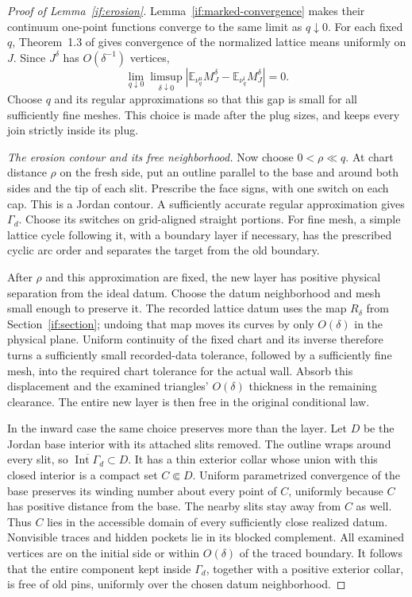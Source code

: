 \documentclass[11pt]{article}
\theoremstyle{definition}
\theoremstyle{remark}
\numberwithin{equation}{section}
\begin{document}
\begin{proof}[Proof of Lemma~\ref{if:erosion}]
Lemma~\ref{if:marked-convergence} makes their continuum one-point
functions converge to the same limit as $q\downarrow0$. For each
fixed $q$, Theorem~1.3 of \cite{CHI2021} gives convergence of the
normalized lattice means uniformly on $J$. Since $J^\delta$ has
$O(\delta^{-1})$ vertices,
\begin{equation}\label{if:envelope-line-gap}
 \lim_{q\downarrow0}\limsup_{\delta\downarrow0}
   |\mathbb E_{\nu_q^{\mathrm u}}M_J^\delta
       -\mathbb E_{\nu_q^{\mathrm l}}M_J^\delta|=0.
\end{equation}
Choose $q$ and its regular approximations so that this gap is small
for all sufficiently fine meshes. This choice is made after the plug
sizes, and keeps every join strictly inside its plug.

\emph{The erosion contour and its free neighborhood.}
Now choose $0<\rho\ll q$. At chart distance $\rho$ on the fresh
side, put an outline parallel to the base and around both sides and
the tip of each slit. Prescribe the face signs, with one switch on
each cap. This is a Jordan contour. A sufficiently accurate regular
approximation gives $\Gamma_d$. Choose its switches on grid-aligned
straight portions. For fine mesh, a simple lattice cycle following
it, with a boundary layer if necessary, has the prescribed cyclic
arc order and separates the target from the old boundary.

After $\rho$ and this approximation are fixed, the new layer has
positive physical separation from the ideal datum. Choose the datum
neighborhood and mesh small enough to preserve it. The recorded
lattice datum uses the map $R_\delta$ from Section~\ref{if:section};
undoing that map moves its curves by only $O(\delta)$ in the physical
plane. Uniform continuity of the fixed chart and its inverse therefore
turns a sufficiently small recorded-data tolerance, followed by a
sufficiently fine mesh, into the required chart tolerance for the
actual wall. Absorb this displacement and the examined triangles'
$O(\delta)$ thickness in the remaining clearance. The entire new
layer is then free in the original conditional law.

In the inward case the same choice preserves more than the layer.
Let $D$ be the Jordan base interior with its attached slits removed.
The outline wraps around every slit, so
$\overline{\operatorname{Int}\Gamma_d}\subset D$. It has a thin
exterior collar whose union with this closed interior is a compact
set $C\Subset D$. Uniform parametrized convergence of the base
preserves its winding number about every point of $C$, uniformly
because $C$ has positive distance from the base. The nearby slits
stay away from $C$ as well. Thus $C$ lies in the accessible domain
of every sufficiently close realized datum. Nonvisible traces and
hidden pockets lie in its blocked complement. All examined vertices
are on the initial side or within $O(\delta)$ of the traced boundary.
It follows that the entire component kept inside $\Gamma_d$, together
with a positive exterior collar, is free of old pins, uniformly over
the chosen datum neighborhood.


\end{proof}
\end{document}
